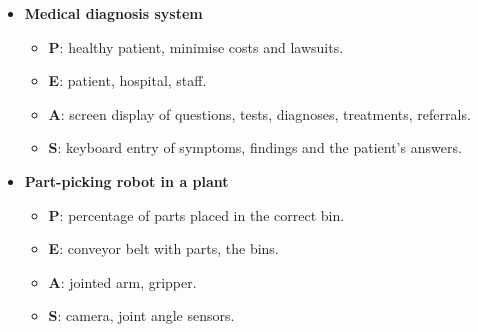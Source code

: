 {\begin{itemize}
\begin{itemize}
  \end{itemize}
  \item \textbf{Medical diagnosis system} 
  \begin{itemize}
    \item \textbf{P}: healthy patient, minimise costs and lawsuits.
    \item \textbf{E}: patient, hospital, staff.
    \item \textbf{A}: screen display of questions, tests, diagnoses, treatments,
          referrals.
    \item \textbf{S}: keyboard entry of symptoms, findings and the patient's answers.
  \end{itemize}
  \item \textbf{Part-picking robot in a plant} 
  \begin{itemize}
    \item \textbf{P}: percentage of parts placed in the correct bin.
    \item \textbf{E}: conveyor belt with parts, the bins.
    \item \textbf{A}: jointed arm, gripper.
    \item \textbf{S}: camera, joint angle sensors.
  \end{itemize}
\end{itemize}}

\vspace{2pt}

